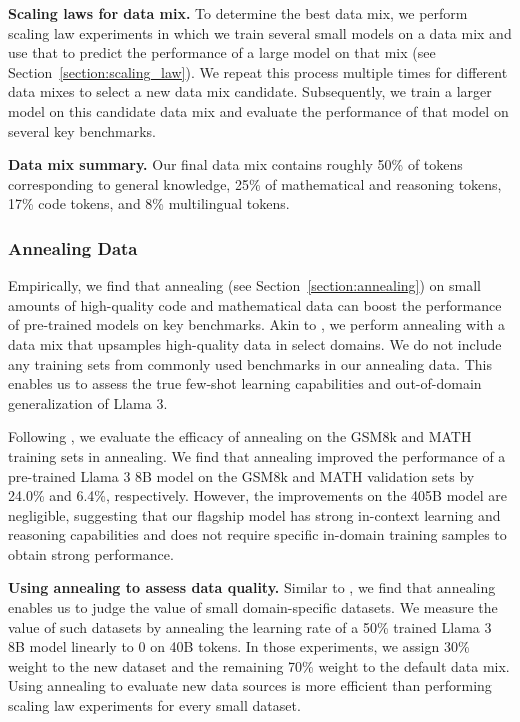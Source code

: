 \textbf{Scaling laws for data mix.} To determine the best data mix, we perform scaling law experiments in which we train several small models on a data mix and use that to predict the performance of a large model on that mix (see Section~\ref{section:scaling_law}).
We repeat this process multiple times for different data mixes to select a new data mix candidate. Subsequently, we train a larger model on this candidate data mix and evaluate the performance of that model on several key benchmarks.

\textbf{Data mix summary.} Our final data mix contains roughly 50\% of tokens corresponding to general knowledge, 25\% of mathematical and reasoning tokens, 17\% code tokens, and 8\% multilingual tokens.

\subsubsection{Annealing Data}
\label{sec:annealing_data}
Empirically, we find that annealing (see Section~\ref{section:annealing}) on small amounts of high-quality code and mathematical data can boost the performance of pre-trained models on key benchmarks. Akin to \citet{li2024datacomplmsearchgenerationtraining}, we perform annealing with a data mix that upsamples high-quality data in select domains. We do not include any training sets from commonly used benchmarks in our annealing data. This enables us to assess the true few-shot learning capabilities and out-of-domain generalization of Llama 3.

Following \citet{openai2023gpt4}, we evaluate the efficacy of annealing on the GSM8k \citep{cobbe2021training} and MATH \citep{hendrycks2021measuring} training sets in annealing. We find that annealing improved the performance of a pre-trained Llama 3 8B model on the GSM8k and MATH validation sets by 24.0\% and 6.4\%, respectively. However, the improvements on the 405B model are negligible, suggesting that our flagship model has strong in-context learning and reasoning capabilities and does not require specific in-domain training samples to obtain strong performance. 

\textbf{Using annealing to assess data quality.} Similar to \citet{blakeney2024doesdatasparkjoy}, we find that annealing enables us to judge the value of small domain-specific datasets. We measure the value of such datasets by annealing the learning rate of a 50\% trained Llama 3 8B model linearly to 0 on 40B tokens. In those experiments, we assign 30\% weight to the new dataset and the remaining 70\% weight to the default data mix. Using annealing to evaluate new data sources is more efficient than performing scaling law experiments for every small dataset.

